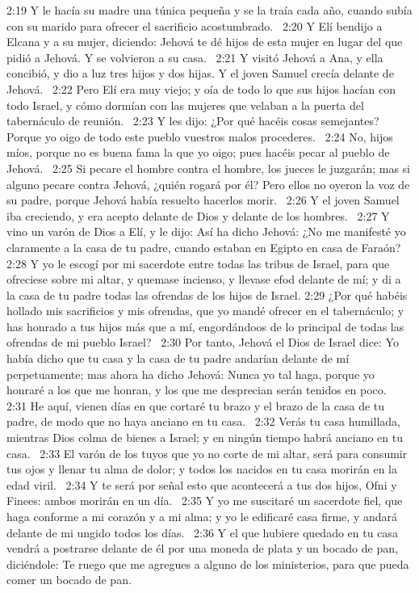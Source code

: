 2:19 Y le hacía su madre una túnica pequeña y se la traía cada año, cuando subía con su marido para ofrecer el sacrificio acostumbrado.  
2:20 Y Elí bendijo a Elcana y a su mujer, diciendo: Jehová te dé hijos de esta mujer en lugar del que pidió a Jehová. Y se volvieron a su casa.  
2:21 Y visitó Jehová a Ana, y ella concibió, y dio a luz tres hijos y dos hijas. Y el joven Samuel crecía delante de Jehová.  
2:22 Pero Elí era muy viejo; y oía de todo lo que sus hijos hacían con todo Israel, y cómo dormían con las mujeres que velaban a la puerta del tabernáculo de reunión.  
2:23 Y les dijo: ¿Por qué hacéis cosas semejantes? Porque yo oigo de todo este pueblo vuestros malos procederes.  
2:24 No, hijos míos, porque no es buena fama la que yo oigo; pues hacéis pecar al pueblo de Jehová.  
2:25 Si pecare el hombre contra el hombre, los jueces le juzgarán; mas si alguno pecare contra Jehová, ¿quién rogará por él? Pero ellos no oyeron la voz de su padre, porque Jehová había resuelto hacerlos morir.  
2:26 Y el joven Samuel iba creciendo, y era acepto delante de Dios y delante de los hombres.  
2:27 Y vino un varón de Dios a Elí, y le dijo: Así ha dicho Jehová: ¿No me manifesté yo claramente a la casa de tu padre, cuando estaban en Egipto en casa de Faraón?  
2:28 Y yo le escogí por mi sacerdote entre todas las tribus de Israel, para que ofreciese sobre mi altar, y quemase incienso, y llevase efod delante de mí; y di a la casa de tu padre todas las ofrendas de los hijos de Israel. 
2:29 ¿Por qué habéis hollado mis sacrificios y mis ofrendas, que yo mandé ofrecer en el tabernáculo; y has honrado a tus hijos más que a mí, engordándoos de lo principal de todas las ofrendas de mi pueblo Israel?  
2:30 Por tanto, Jehová el Dios de Israel dice: Yo había dicho que tu casa y la casa de tu padre andarían delante de mí perpetuamente; mas ahora ha dicho Jehová: Nunca yo tal haga, porque yo honraré a los que me honran, y los que me desprecian serán tenidos en poco.  
2:31 He aquí, vienen días en que cortaré tu brazo y el brazo de la casa de tu padre, de modo que no haya anciano en tu casa.  
2:32 Verás tu casa humillada, mientras Dios colma de bienes a Israel; y en ningún tiempo habrá anciano en tu casa.  
2:33 El varón de los tuyos que yo no corte de mi altar, será para consumir tus ojos y llenar tu alma de dolor; y todos los nacidos en tu casa morirán en la edad viril.  
2:34 Y te será por señal esto que acontecerá a tus dos hijos, Ofni y Finees: ambos morirán en un día.  
2:35 Y yo me suscitaré un sacerdote fiel, que haga conforme a mi corazón y a mi alma; y yo le edificaré casa firme, y andará delante de mi ungido todos los días.  
2:36 Y el que hubiere quedado en tu casa vendrá a postrarse delante de él por una moneda de plata y un bocado de pan, diciéndole: Te ruego que me agregues a alguno de los ministerios, para que pueda comer un bocado de pan.  
